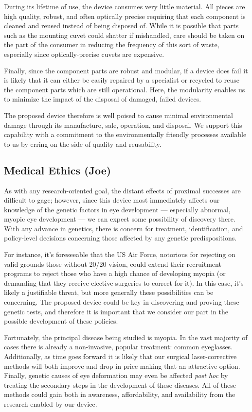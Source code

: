 \documentclass{article}
\begin{document}
During its lifetime of use, the device consumes very little
material. All pieces are high quality, robust, and often optically
precise requiring that each component is cleaned and reused instead of
being disposed of. While it is possible that parts such as the
mounting cuvet could shatter if mishandled, care should be taken on
the part of the consumer in reducing the frequency of this sort of
waste, especially since optically-precise cuvets are expensive.

Finally, since the component parts are robust and modular, if a device
does fail it is likely that it can either be easily repaired by a
specialist or recycled to reuse the component parts which are still
operational. Here, the modularity enables us to minimize the impact of
the disposal of damaged, failed devices.

The proposed device therefore is well poised to cause minimal
environmental damage through its manufacture, sale, operation, and
disposal. We support this capability with a commitment to the
environmentally friendly processes available to us by erring on the
side of quality and reusability.


\subsection{Medical Ethics (Joe)}
\label{sec:blah-blah-blah}

As with any research-oriented goal, the distant effects of proximal
successes are difficult to gage; however, since this device most
immediately affects our knowledge of the genetic factors in eye
development --- especially abnormal, myopic eye development --- we can
expect some possibility of discovery there. With any advance in
genetics, there is concern for treatment, identification, and
policy-level decisions concerning those affected by any genetic
predispositions.

For instance, it's foreseeable that the US Air Force, notorious for
rejecting on valid grounds those without 20/20 vision, could extend
their recruitment programs to reject those who have a high chance of
developing myopia (or demanding that they receive elective surgeries
to correct for it). In this case, it's likely a justifiable threat,
but more generally these possibilities can be concerning. The proposed
device could be key in discovering and proving these genetic tests,
and therefore it is important that we consider our part in the
possible development of these policies.

Fortunately, the principal disease being studied is myopia. In the
vast majority of cases there is already a non-invasive, popular
treatment: common eyeglasses. Additionally, as time goes forward it is
likely that our surgical laser-corrective methods will both improve
and drop in price making that an attractive option. Finally, genetic
causes of eye deformation may even be affected \textit{post hoc} by
treating the secondary steps in the development of these diseases. All
of these methods could gain both in awareness, affordability, and
availability from the research enabled by our device.
\end{document}
